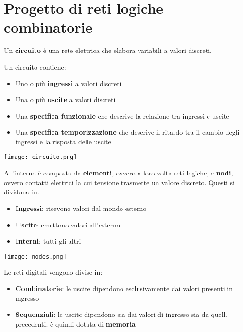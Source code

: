 \newpage
\section{Progetto di reti logiche combinatorie}
\begin{definition}[Circuito]
	Un \textbf{circuito} è una rete elettrica che elabora variabili a valori discreti.
\end{definition}
Un circuito contiene:
\begin{itemize}
	\item Uno o più \textbf{ingressi} a valori discreti
	\item Una o più \textbf{uscite} a valori discreti
	\item Una \textbf{specifica funzionale} che descrive la relazione tra ingressi e uscite
	\item Una \textbf{specifica temporizzazione} che descrive il ritardo tra il cambio degli ingressi e la risposta delle uscite
\end{itemize}
\begin{center}
	\texttt{[image: circuito.png]}
\end{center}
All'interno è composta da \textbf{elementi}, ovvero a loro volta reti logiche, e \textbf{nodi}, ovvero contatti elettrici la cui tensione trasmette un valore discreto. Questi si dividono in:
\begin{itemize}
	\item \textbf{Ingressi}: ricevono valori dal mondo esterno
	\item \textbf{Uscite}: emettono valori all'esterno
	\item \textbf{Interni}: tutti gli altri
\end{itemize}
\begin{center}
	\texttt{[image: nodes.png]}
\end{center}

Le reti digitali vengono divise in:
\begin{itemize}
	\item \textbf{Combinatorie}: le uscite dipendono esclusivamente dai valori presenti in ingresso
	\item \textbf{Sequenziali}: le uscite dipendono sia dai valori di ingresso sia da quelli precedenti. è quindi dotata di \textbf{memoria}
\end{itemize}

